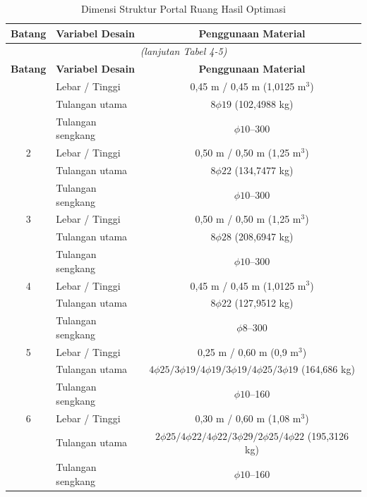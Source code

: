 \begingroup
\footnotesize
\begin{longtable}{clcc}
\caption{Dimensi Struktur Portal Ruang Hasil Optimasi}
\label{tab:4-5}\\
\toprule
\textbf{Batang} & \textbf{Variabel Desain} & \multicolumn{2}{c}{\textbf{Penggunaan Material}} \\
\midrule
\endfirsthead
\multicolumn{4}{c}{\textit{(lanjutan Tabel 4-5)}}\\
\toprule
\textbf{Batang} & \textbf{Variabel Desain} & \multicolumn{2}{c}{\textbf{Penggunaan Material}} \\
\midrule
\endhead
\bottomrule
\endfoot
\bottomrule
\endlastfoot
1 & Lebar / Tinggi & \multicolumn{2}{c}{0,45 m / 0,45 m (1,0125 m$^3$)} \\
  & Tulangan utama & \multicolumn{2}{c}{$8\phi19$ (102,4988 kg)} \\
  & Tulangan sengkang & \multicolumn{2}{c}{$\phi10$--300} \\
2 & Lebar / Tinggi & \multicolumn{2}{c}{0,50 m / 0,50 m (1,25 m$^3$)} \\
  & Tulangan utama & \multicolumn{2}{c}{$8\phi22$ (134,7477 kg)} \\
  & Tulangan sengkang & \multicolumn{2}{c}{$\phi10$--300} \\
3 & Lebar / Tinggi & \multicolumn{2}{c}{0,50 m / 0,50 m (1,25 m$^3$)} \\
  & Tulangan utama & \multicolumn{2}{c}{$8\phi28$ (208,6947 kg)} \\
  & Tulangan sengkang & \multicolumn{2}{c}{$\phi10$--300} \\
4 & Lebar / Tinggi & \multicolumn{2}{c}{0,45 m / 0,45 m (1,0125 m$^3$)} \\
  & Tulangan utama & \multicolumn{2}{c}{$8\phi22$ (127,9512 kg)} \\
  & Tulangan sengkang & \multicolumn{2}{c}{$\phi8$--300} \\
5 & Lebar / Tinggi & \multicolumn{2}{c}{0,25 m / 0,60 m (0,9 m$^3$)} \\
  & Tulangan utama & \multicolumn{2}{c}{$4\phi25/3\phi19/4\phi19/3\phi19/4\phi25/3\phi19$ (164,686 kg)} \\
  & Tulangan sengkang & \multicolumn{2}{c}{$\phi10$--160} \\
6 & Lebar / Tinggi & \multicolumn{2}{c}{0,30 m / 0,60 m (1,08 m$^3$)} \\
  & Tulangan utama & \multicolumn{2}{c}{$2\phi25/4\phi22/4\phi22/3\phi29/2\phi25/4\phi22$ (195,3126 kg)} \\
  & Tulangan sengkang & \multicolumn{2}{c}{$\phi10$--160} \\

\end{longtable}
